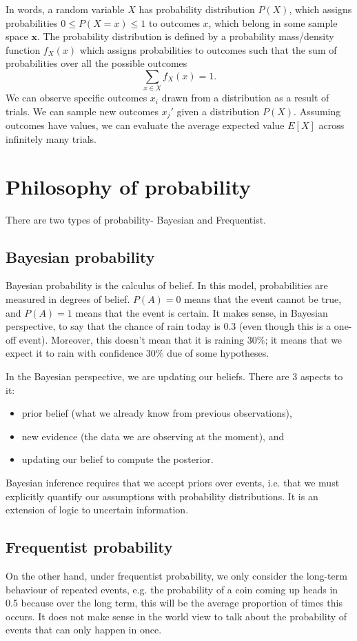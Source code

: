 \documentclass[a4paper, openany]{memoir}
\begin{document}
In words, a random variable $X$ has probability distribution $P(X)$, which assigns probabilities $0 \leq P(X = x) \leq 1$ to outcomes $x$, which belong in some sample space $\mathbf{x}$. The probability distribution is defined by a probability mass/density function $f_X(x)$ which assigns probabilities to outcomes such that the sum of probabilities over all the possible outcomes
\[\sum_{x \in X} f_X(x) = 1.\]
We can observe specific outcomes $x_i$ drawn from a distribution as a result of trials. We can sample new outcomes $x_j'$ given a distribution $P(X)$. Assuming outcomes have values, we can evaluate the average expected value $E[X]$ across infinitely many trials.

\section{Philosophy of probability}
There are two types of probability- Bayesian and Frequentist.

\subsection{Bayesian probability}
Bayesian probability is the calculus of belief. In this model, probabilities are measured in degrees of belief. $P(A) = 0$ means that the event cannot be true, and $P(A) = 1$ means that the event is certain. It makes sense, in Bayesian perspective, to say that the chance of rain today is $0.3$ (even though this is a one-off event). Moreover, this doesn't mean that it is raining $30\%$; it means that we expect it to rain with confidence $30\%$ due of some hypotheses.

In the Bayesian perspective, we are updating our beliefs. There are 3 aspects to it:
\begin{itemize}
    \item prior belief (what we already know from previous observations),
    \item new evidence (the data we are observing at the moment), and
    \item updating our belief to compute the posterior.
\end{itemize}
\noindent Bayesian inference requires that we accept priors over events, i.e. that we must explicitly quantify our assumptions with probability distributions. It is an extension of logic to uncertain information.

\subsection{Frequentist probability}
On the other hand, under frequentist probability, we only consider the long-term behaviour of repeated events, e.g. the probability of a coin coming up heads in 0.5 because over the long term, this will be the average proportion of times this occurs. It does not make sense in the world view to talk about the probability of events that can only happen in once.
\end{document}
